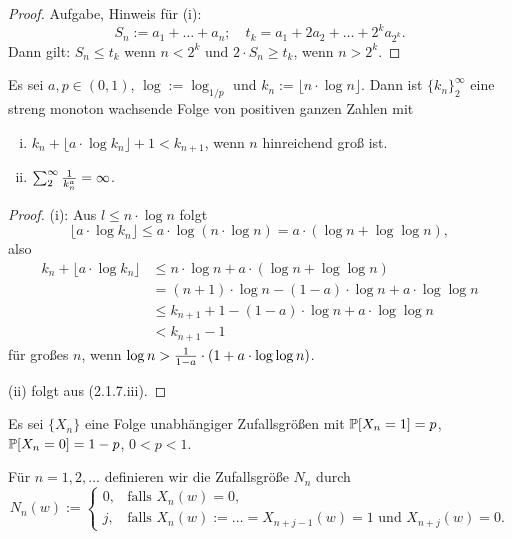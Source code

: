 \begin{proof}
  Aufgabe, Hinweis für (i):
  \[ S_n := a_1 + \ldots + a_n; \quad t_k = a_1 + 2 a_2 + \ldots + 2^k
    a_{2^k}. \]
  Dann gilt: $S_n \le t_k$ wenn $n < 2^k$ und $2 \cdot S_n \ge t_k$, wenn $n > 2^k$.
\end{proof}

\clearpage

\begin{lem}
  Es sei $a, p \in (0,1)$, $\log := \log_{1/p}$ und $k_n := \lfloor n \cdot \log
  n \rfloor$. Dann ist $\{ k_n \}_2^\infty$ eine streng monoton wachsende Folge
  von positiven ganzen Zahlen mit
  \begin{enumerate}[(i)]
  \item $k_n + \lfloor a \cdot \log k_n \rfloor + 1 < k_{n+1}$, wenn $n$
    hinreichend groß ist.
  \item $\sum_2^\infty \frac{1}{k_n^a} = \infty$.
  \end{enumerate}
\end{lem}  

\begin{proof}
  (i): Aus $l \le n \cdot \log n$ folgt 
  \[ \lfloor a \cdot \log k_n \rfloor 
    \le a \cdot \log( n \cdot \log n ) 
    = a \cdot (\log n + \log \log n), \]
  also
  \begin{align*}
    k_n + \lfloor a \cdot \log k_n \rfloor
    &\le n \cdot \log n + a \cdot (\log n + \log \log n) \\
    &= (n+1) \cdot \log n - (1-a) \cdot \log n + a \cdot \log \log n \\
    &\le k_{n+1} + 1 - (1-a) \cdot \log n + a \cdot \log \log n \\
    &< k_{n+1} - 1
  \end{align*}  
  für großes $n$, wenn $\log n > \frac{1}{1-a} \cdot ( 1 + a \cdot \log \log n)$.

  (ii) folgt aus (2.1.7.iii).
\end{proof}

\begin{defn}
  Es sei $\{ X_n \}$ eine Folge unabhängiger Zufallsgrößen mit $\mathbb{P} [X_n = 1] =
  p$, $\mathbb{P}[X_n = 0] = 1-p$, $0 < p < 1$.

  Für $n = 1, 2, \ldots$ definieren wir die Zufallsgröße $N_n$ durch
  \[ N_n(w) := \begin{cases}
    0, & \text{falls } X_n(w) = 0, \\
    j, & \text{falls } X_n(w) := \ldots = X_{n+j-1}(w) = 1 \text{ und }
    X_{n+j}(w) = 0.
  \end{cases} \]
\end{defn}

